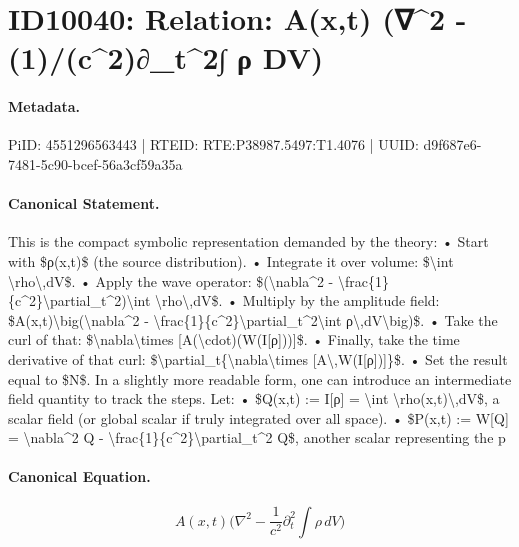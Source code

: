 \section*{ID10040: Relation: A(x,t) (∇\textasciicircum{}2 - (1)/(c\textasciicircum{}2)∂\_t\textasciicircum{}2∫ ρ DV)}
\paragraph{Metadata.}
PiID: 4551296563443 | RTEID: RTE:P38987.5497:T1.4076 | UUID: d9f687e6-7481-5c90-bcef-56a3cf59a35a

\paragraph{Canonical Statement.}
This is the compact symbolic representation demanded by the theory: • Start with \$ρ(x,t)\$ (the source distribution). • Integrate it over volume: \$\textbackslash{}int \textbackslash{}rho\textbackslash{},dV\$. • Apply the wave operator: \$(\textbackslash{}nabla\textasciicircum{}2 - \textbackslash{}frac\{1\}\{c\textasciicircum{}2\}\textbackslash{}partial\_t\textasciicircum{}2)\textbackslash{}int \textbackslash{}rho\textbackslash{},dV\$. • Multiply by the amplitude field: \$A(x,t)\textbackslash{}big(\textbackslash{}nabla\textasciicircum{}2 - \textbackslash{}frac\{1\}\{c\textasciicircum{}2\}\textbackslash{}partial\_t\textasciicircum{}2\textbackslash{}int ρ\textbackslash{},dV\textbackslash{}big)\$. • Take the curl of that: \$\textbackslash{}nabla\textbackslash{}times [A(\textbackslash{}cdot)(W(I[ρ]))]\$. • Finally, take the time derivative of that curl: \$\textbackslash{}partial\_t\{\textbackslash{}nabla\textbackslash{}times [A\textbackslash{},W(I[ρ])]\}\$. • Set the result equal to \$N\$. In a slightly more readable form, one can introduce an intermediate field quantity to track the steps. Let: • \$Q(x,t) := I[ρ] = \textbackslash{}int \textbackslash{}rho(x,t)\textbackslash{},dV\$, a scalar field (or global scalar if truly integrated over all space). • \$P(x,t) := W[Q] = \textbackslash{}nabla\textasciicircum{}2 Q - \textbackslash{}frac\{1\}\{c\textasciicircum{}2\}\textbackslash{}partial\_t\textasciicircum{}2 Q\$, another scalar representing the p

\paragraph{Canonical Equation.}
\[
A(x,t)\big(\nabla^2 - \frac{1}{c^2}\partial_t^2\int ρ\,dV\big)
\]

